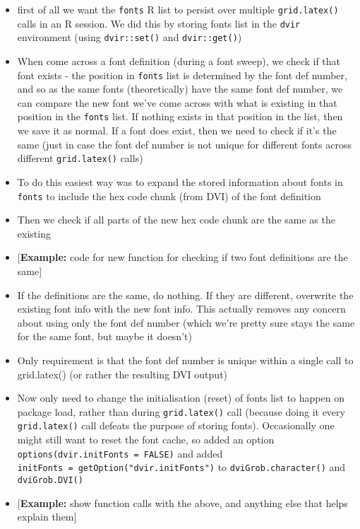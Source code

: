 \documentclass[]{article}
\begin{document}
\begin{itemize}
\item
  first of all we want the \texttt{fonts} R list to persist over
  multiple \texttt{grid.latex()} calls in an R session. We did this by
  storing fonts list in the \texttt{dvir} environment (using
  \texttt{dvir::set()} and \texttt{dvir::get()})
\item
  When come across a font definition (during a font sweep), we check if
  that font exists - the position in \texttt{fonts} list is determined
  by the font def number, and so as the same fonts (theoretically) have
  the same font def number, we can compare the new font we've come
  across with what is existing in that position in the \texttt{fonts}
  list. If nothing exists in that position in the list, then we save it
  as normal. If a font does exist, then we need to check if it's the
  same (just in case the font def number is not unique for different
  fonts across different \texttt{grid.latex()} calls)
\item
  To do this easiest way was to expand the stored information about
  fonts in \texttt{fonts} to include the hex code chunk (from DVI) of
  the font definition
\item
  Then we check if all parts of the new hex code chunk are the same as
  the existing
\item
  {[}\textbf{Example:} code for new function for checking if two font
  definitions are the same{]}
\item
  If the definitions are the same, do nothing. If they are different,
  overwrite the existing font info with the new font info. This actually
  removes any concern about using only the font def number (which we're
  pretty sure stays the same for the same font, but maybe it doesn't)
\item
  Only requirement is that the font def number is unique within a single
  call to grid.latex() (or rather the resulting DVI output)
\item
  Now only need to change the initialisation (reset) of fonts list to
  happen on package load, rather than during \texttt{grid.latex()} call
  (because doing it every \texttt{grid.latex()} call defeats the purpose
  of storing fonts). Occasionally one might still want to reset the font
  cache, so added an option \texttt{options(dvir.initFonts\ =\ FALSE)}
  and added \texttt{initFonts\ =\ getOption("dvir.initFonts")} to
  \texttt{dviGrob.character()} and \texttt{dviGrob.DVI()}
\item
  {[}\textbf{Example:} show function calls with the above, and anything
  else that helps explain them{]}
\end{itemize}
\end{document}
